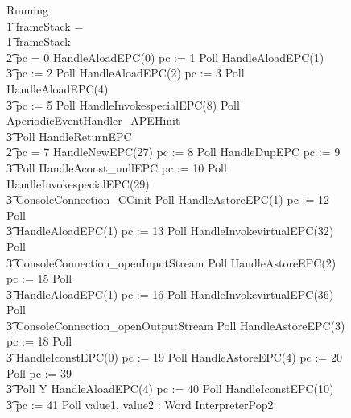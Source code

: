 \begin{figure}[t!]
  \setlength{\zedindent}{0cm}
  \setlength{\zedtab}{0.5cm}
  \setlength{\zedleftsep}{0.1cm}
  \begin{circus}
    Running \circdef \\
    \t1 \circif frameStack = \emptyset \circthen \Skip \\
    \t1 {} \circelse frameStack \neq \emptyset \circthen {} \\
    \t2 \circif pc = 0 \circthen HandleAloadEPC(0) \circseq pc := 1 \circseq Poll \circseq HandleAloadEPC(1) \circseq \\
    \t3 pc := 2 \circseq Poll \circseq HandleAloadEPC(2) \circseq pc := 3 \circseq Poll \circseq HandleAloadEPC(4) \circseq \\
    \t3 pc := 5 \circseq Poll \circseq HandleInvokespecialEPC(8) \circseq Poll \circseq AperiodicEventHandler\_APEHinit \circseq \\
    \t3 Poll \circseq HandleReturnEPC \\
    \t2 {} \circelse pc = 7 \circthen HandleNewEPC(27) \circseq pc := 8 \circseq Poll \circseq HandleDupEPC \circseq pc := 9 \circseq \\
    \t3 Poll \circseq HandleAconst\_nullEPC \circseq pc := 10 \circseq Poll \circseq HandleInvokespecialEPC(29) \circseq \\
    \t3 ConsoleConnection\_CCinit \circseq Poll \circseq HandleAstoreEPC(1) \circseq pc := 12 \circseq Poll \circseq \\
    \t3 HandleAloadEPC(1) \circseq pc := 13 \circseq Poll \circseq HandleInvokevirtualEPC(32) \circseq Poll \circseq \\
    \t3 ConsoleConnection\_openInputStream \circseq Poll \circseq  HandleAstoreEPC(2) \circseq pc := 15 \circseq Poll \circseq \\
    \t3 HandleAloadEPC(1) \circseq pc := 16 \circseq Poll \circseq HandleInvokevirtualEPC(36) \circseq Poll \circseq \\
    \t3 ConsoleConnection\_openOutputStream \circseq Poll \circseq HandleAstoreEPC(3) \circseq pc := 18 \circseq Poll \circseq \\
    \t3 HandleIconstEPC(0) \circseq pc := 19 \circseq Poll \circseq HandleAstoreEPC(4) \circseq pc := 20 \circseq Poll \circseq pc := 39 \circseq \\
    \t3 Poll \circseq\circmu Y \circspot HandleAloadEPC(4) \circseq pc := 40 \circseq Poll \circseq HandleIconstEPC(10) \circseq \\
    \t3 pc := 41 \circseq Poll \circseq \circvar value1, value2 : Word \circspot InterpreterPop2 \circseq \\

\end{circus}
\end{figure}

